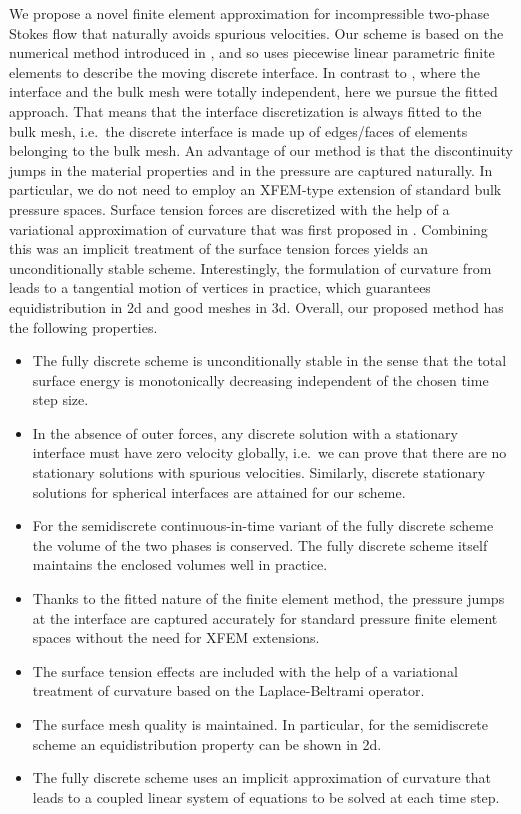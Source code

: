 \documentclass[a4paper,11pt,onecolumn]{article}
\begin{document}
We propose a novel finite element approximation for
incompressible two-phase Stokes flow that naturally avoids spurious
velocities. Our scheme is based on the numerical method introduced in
\cite{spurious}, and so uses piecewise linear parametric finite elements to
describe the moving discrete interface. In contrast to \cite{spurious}, where
the interface and the bulk mesh were totally independent, here we pursue the
fitted approach. That means that the interface discretization is always fitted
to the bulk mesh, i.e.\ the discrete interface is made up of edges/faces of
elements belonging to the bulk mesh. An advantage of our method is that the
discontinuity jumps in the material properties and in the pressure are captured
naturally. In particular, we do not need to employ an XFEM-type extension of
standard bulk pressure spaces. Surface tension forces are discretized with the
help of a variational approximation of curvature that was first proposed in
\cite{triplej,gflows3d}. Combining this was an implicit treatment of the
surface tension forces yields an unconditionally stable scheme. Interestingly,
the formulation of curvature from \cite{triplej} leads to a tangential motion
of vertices in practice, which guarantees equidistribution in 2d and good
meshes in 3d. Overall, our proposed method has the following properties.
\begin{itemize}
\item The fully discrete scheme is unconditionally stable in the sense that the
total surface energy is monotonically decreasing independent of the chosen time
step size.
\item In the absence of outer forces, any discrete solution with a stationary
interface must have zero velocity globally, i.e.\ we can prove that there are
no stationary solutions with spurious velocities. Similarly, discrete
stationary solutions for spherical interfaces are attained for our scheme.
\item For the semidiscrete continuous-in-time variant of the fully discrete
scheme the volume
of the two phases is conserved. The fully discrete scheme itself maintains the
enclosed volumes well in practice.
\item Thanks to the fitted nature of the finite element method, the pressure
jumps at the interface are captured accurately for standard pressure finite
element spaces without the need for XFEM extensions.
\item The surface tension effects are included with the help of a variational
treatment of curvature based on the Laplace-Beltrami operator.
\item The surface mesh quality is maintained. In particular, for the
semidiscrete scheme an equidistribution property can be shown in 2d.
\item The fully discrete scheme uses an implicit approximation of curvature
that leads to a coupled linear system of equations to be solved at each time
step.
\end{itemize}
\end{document}

